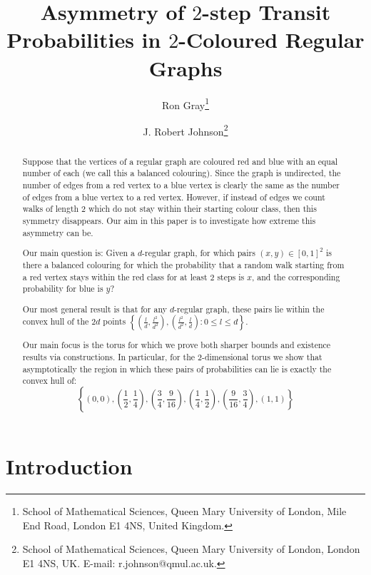\documentclass[12pt,a4paper]{article}
\begin{document}
\title{Asymmetry of $2$-step Transit Probabilities in $2$-Coloured Regular Graphs} 
\author{Ron Gray\thanks{School of Mathematical Sciences, Queen Mary University of London, Mile End Road, London E1 4NS, United Kingdom.}
\and
J. Robert Johnson\thanks{School of Mathematical Sciences, Queen Mary University of London, London E1 4NS, UK.  E-mail: r.johnson@qmul.ac.uk.}}
\maketitle

\begin{abstract}
Suppose that the vertices of a regular graph are coloured red and blue with an equal number of each (we call this a balanced colouring). Since the graph is undirected, the number of edges from a red vertex to a blue vertex is clearly the same as the number of edges from a blue vertex to a red vertex. However, if instead of edges we count walks of length $2$ which do not stay within their starting colour class, then this symmetry disappears. Our aim in this paper is to investigate how extreme this asymmetry can be.

Our main question is: Given a $d$-regular graph, for which pairs $(x,y)\in[0,1]^2$ is there a balanced colouring for which the probability that a random walk starting from a red vertex stays within the red class for at least $2$ steps is $x$, and the corresponding probability for blue is $y$? 

Our most general result is that for any $d$-regular graph, these pairs lie within the convex hull of the $2d$ points $\left\{\left(\frac{l}{d},\frac{l^2}{d^2}\right),\left(\frac{l^2}{d^2},\frac{l}{d}\right) :0\leq l\leq d\right\}$.

Our main focus is the torus for which we prove both sharper bounds and existence results via constructions. In particular, for the $2$-dimensional torus we show that asymptotically the region in which these pairs of probabilities can lie is exactly the convex hull of:
\[
\left\{\left(0,0\right),\left(\frac{1}{2},\frac{1}{4}\right),\left(\frac{3}{4},\frac{9}{16}\right),\left(\frac{1}{4},\frac{1}{2}\right),\left(\frac{9}{16},\frac{3}{4}\right),\left(1,1\right)\right\}
\]
\end{abstract}

\section{Introduction}
\end{document}
